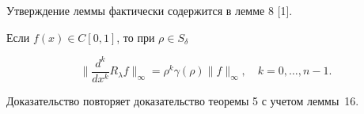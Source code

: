 Утверждение леммы фактически содержится в лемме 8 [1].





\begin{lem}


Если $f(x)\in C[0,1]$, то при $\rho\in S_\delta$


$$


\bigg\| \frac {d^k}{dx^k}R_\lambda f\bigg\|_\infty=\rho^k\gamma


(\rho)\|f\|_\infty,\quad k=0,\dotsc,n-1.


$$


\end{lem}





Доказательство повторяет доказательство теоремы 5 с учетом леммы~16.





